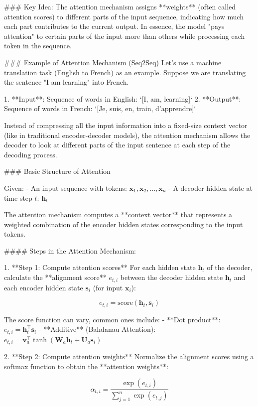 ### Key Idea:
The attention mechanism assigns **weights** (often called attention scores) to different parts of the input sequence, indicating how much each part contributes to the current output. In essence, the model "pays attention" to certain parts of the input more than others while processing each token in the sequence.

### Example of Attention Mechanism (Seq2Seq)
Let's use a machine translation task (English to French) as an example. Suppose we are translating the sentence "I am learning" into French. 

1. **Input**: Sequence of words in English: `[I, am, learning]`
2. **Output**: Sequence of words in French: `[Je, suis, en, train, d'apprendre]`

Instead of compressing all the input information into a fixed-size context vector (like in traditional encoder-decoder models), the attention mechanism allows the decoder to look at different parts of the input sentence at each step of the decoding process.

### Basic Structure of Attention

Given:
- An input sequence with tokens: \(\mathbf{x}_1, \mathbf{x}_2, ..., \mathbf{x}_n\)
- A decoder hidden state at time step \(t\): \(\mathbf{h}_t\)

The attention mechanism computes a **context vector** that represents a weighted combination of the encoder hidden states corresponding to the input tokens.

#### Steps in the Attention Mechanism:

1. **Step 1: Compute attention scores**  
   For each hidden state \(\mathbf{h}_t\) of the decoder, calculate the **alignment score** \(e_{t,i}\) between the decoder hidden state \(\mathbf{h}_t\) and each encoder hidden state \(\mathbf{s}_i\) (for input \(\mathbf{x}_i\)):

   \[
   e_{t,i} = \text{score}(\mathbf{h}_t, \mathbf{s}_i)
   \]

   The score function can vary, common ones include:
   - **Dot product**: \( e_{t,i} = \mathbf{h}_t^\top \mathbf{s}_i \)
   - **Additive** (Bahdanau Attention): \( e_{t,i} = \mathbf{v}_a^\top \tanh(\mathbf{W}_a \mathbf{h}_t + \mathbf{U}_a \mathbf{s}_i) \)

2. **Step 2: Compute attention weights**  
   Normalize the alignment scores using a softmax function to obtain the **attention weights**:

   \[
   \alpha_{t,i} = \frac{\exp(e_{t,i})}{\sum_{j=1}^{n} \exp(e_{t,j})}
   \]

